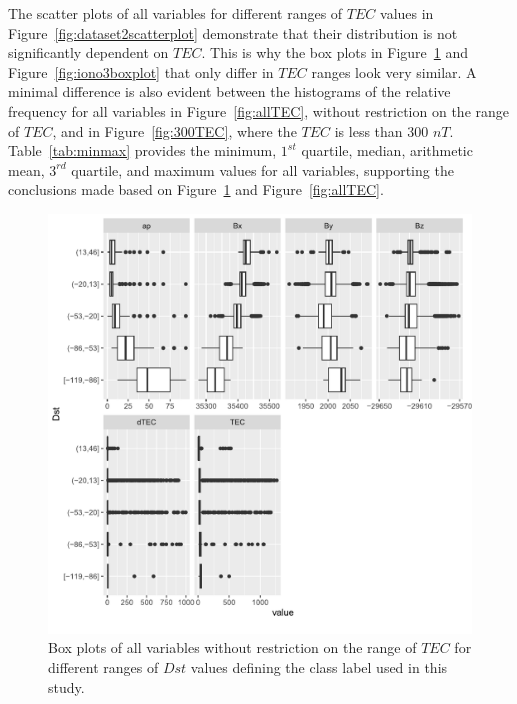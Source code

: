 \documentclass[sn-mathphys-num]{sn-jnl}%
\begin{document}
The scatter plots of all variables for different ranges of $TEC$ values in Figure~\ref{fig:dataset2scatterplot} demonstrate that their distribution is not significantly dependent on $TEC$. This is why the box plots in Figure~\ref{fig:dataset2boxplot} and Figure~\ref{fig:iono3boxplot} that only differ in $TEC$ ranges look very similar. A minimal difference is also evident between the histograms of the relative frequency for all variables in Figure~\ref{fig:allTEC}, without restriction on the range of $TEC$, and in Figure~\ref{fig:300TEC}, where the $TEC$ is less than $300$ $nT$. Table~\ref{tab:minmax} provides the minimum, $1^{st}$ quartile, median, arithmetic mean, $3^{rd}$ quartile, and maximum values for all variables, supporting the conclusions made based on Figure~\ref{fig:dataset2boxplot} and Figure~\ref{fig:allTEC}.

\begin{figure}
    \centering
    \includegraphics[width=0.9\linewidth]{dataset2boxplot_fix.pdf}
    \caption{Box plots of all variables without restriction on the range of $TEC$ for different ranges of $Dst$ values defining the class label used in this study.}
    \label{fig:dataset2boxplot}
\end{figure}
\end{document}
